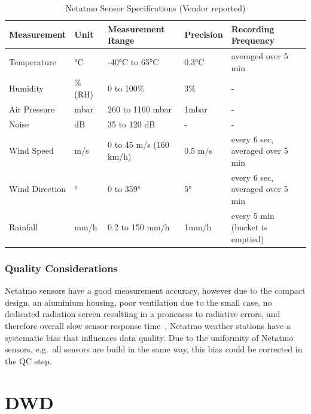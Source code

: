 \begin{table}[]
\begin{tabular}{@{}lllll@{}}
\toprule
Measurement    & Unit    & Measurement Range      & Precision  & Recording Frequency              \\ \midrule
Temperature    & °C      & -40°C to 65°C          & 0.3°C   & averaged over 5 min              \\
Humidity       & \% (RH) & 0 to 100\%             & 3\%     & -                                \\
Air Pressure   & mbar    & 260 to 1160 mbar       & 1mbar   & -                                \\
Noise          & dB      & 35 to 120 dB           & -       & -                                \\
Wind Speed     & m/s     & 0 to 45 m/s (160 km/h) & 0.5 m/s & every 6 sec, averaged over 5 min \\
Wind Direction & °       & 0 to 359°              & 5°      & every 6 sec, averaged over 5 min \\
Rainfall       & mm/h    & 0.2 to 150 mm/h        & 1mm/h   & every 5 min (bucket is emptied)  \\ \bottomrule
\end{tabular}
\caption{Netatmo Sensor Specifications (Vendor reported)}
\label{tab: netatmo sensor specs}
\end{table}

\subsubsection{Quality Considerations}

Netatmo sensors have a good measurement accuracy, however due to the compact design, an aluminium housing, poor ventilation due to the small case, no dedicated radiation screen resultiing in a proneness to radiative errors, and therefore overall slow sensor-response time~\cite{meier2017crowdsourcing, buchau2018modelling}, Netatmo weather stations have a systematic bias that influences data quality. Due to the uniformity of Netatmo sensors, e.g.\ all sensors are build in the same way, this bias could be corrected in the QC step.

\section{DWD}

